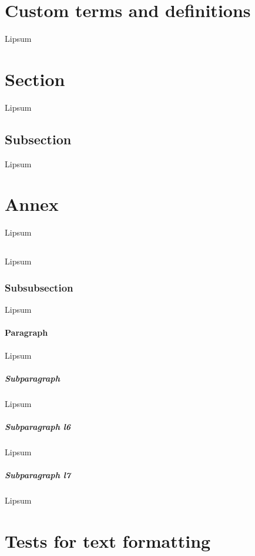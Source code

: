 \documentclass{Metanorma}
\begin{document}
  \section{Custom terms and definitions}

  Lipsum

  \section{Section}

  Lipsum

  \subsection{Subsection}

  Lipsum

  \section{Annex}

  Lipsum

  \subsection{}

  Lipsum

  \subsubsection{Subsubsection}

  Lipsum

  \paragraph{Paragraph}

  Lipsum

  \subparagraph{Subparagraph}

  Lipsum

  \subparagraph{Subparagraph l6}

  Lipsum

  \subparagraph{Subparagraph l7}

  Lipsum

  \section{Tests for text formatting}
\end{document}
